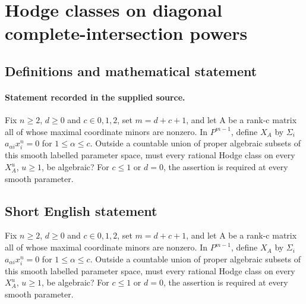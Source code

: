 \documentclass[11pt]{article}
\begin{document}
\section*{Hodge classes on diagonal complete-intersection powers}\label{statement}
\subsection{Definitions and mathematical statement}
\paragraph{Statement recorded in the supplied source.}
Fix $n\geq 2$, $d\geq 0$ and $c\in {0,1,2}$, set $m=d+c+1$, and let A be a rank-c matrix all of whose maximal coordinate minors are nonzero. In $P^{m-1}$, define $X_A$ by $\Sigma _i$ $a_{\alpha i}x_i^n=0$ for $1\leq \alpha \leq c$. Outside a countable union of proper algebraic subsets of this smooth labelled parameter space, must every rational Hodge class on every $X_A^u$, $u\geq 1$, be algebraic? For $c\leq 1$ or $d=0$, the assertion is required at every smooth parameter.
\subsection{Short English statement}
Fix $n\geq 2$, $d\geq 0$ and $c\in {0,1,2}$, set $m=d+c+1$, and let A be a rank-c matrix all of whose maximal coordinate minors are nonzero. In $P^{m-1}$, define $X_A$ by $\Sigma _i$ $a_{\alpha i}x_i^n=0$ for $1\leq \alpha \leq c$. Outside a countable union of proper algebraic subsets of this smooth labelled parameter space, must every rational Hodge class on every $X_A^u$, $u\geq 1$, be algebraic? For $c\leq 1$ or $d=0$, the assertion is required at every smooth parameter.
\end{document}
